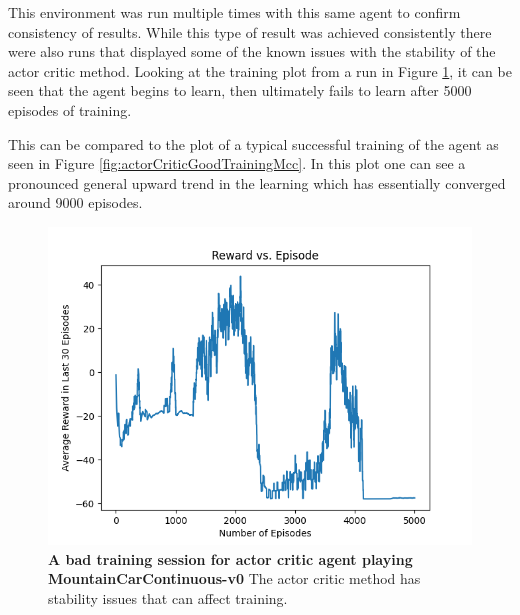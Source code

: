 \documentclass[conference]{IEEEtran}
\begin{document}
This environment was run multiple times with this same agent to confirm consistency of results.
While this type of result was achieved consistently there were also runs that displayed some of the known issues with the stability of the actor critic method.
Looking at the training plot from a run in Figure \ref{fig:actorCriticBadTrainingMcc},  it can be seen that the agent begins to learn, then ultimately fails to learn after 5000 episodes of training.

This can be compared to the plot of a typical successful training of the agent as seen in Figure \ref{fig:actorCriticGoodTrainingMcc}.
In this plot one can see a pronounced general upward trend in the learning which has essentially converged around 9000 episodes.

\begin{figure}[htbp]
\centerline{\includegraphics[scale=0.5]{bad_actor_critic_mcc.png}}
\caption{\textbf{A bad training session for actor critic agent playing MountainCarContinuous-v0}  The actor critic method has stability issues that can affect training.}
\label{fig:actorCriticBadTrainingMcc}
\end{figure}
\end{document}
